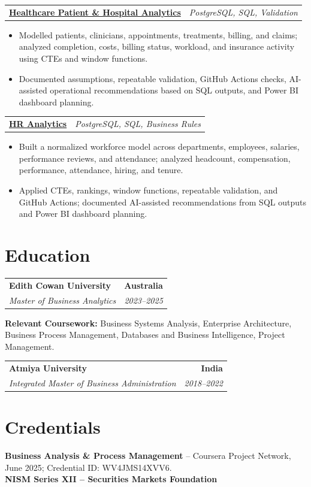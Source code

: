 \documentclass[letterpaper,10pt]{article}
\makeatletter
\newcommand{\role}[4]{%
  \begin{tabularx}{\textwidth}{@{}Xr@{}}
    \textbf{#1} & \textbf{#2} \\
    \textit{#3} & \textit{#4}
  \end{tabularx}\vspace{-1pt}
}
\newcommand{\project}[2]{%
  \begin{tabularx}{\textwidth}{@{}Xr@{}}
    \textbf{#1} & \textit{#2}
  \end{tabularx}\vspace{-1pt}
}
\makeatother
\begin{document}
\project{\href{https://github.com/jainalimehta/Healthcare-Analytics}{Healthcare Patient \& Hospital Analytics}}{PostgreSQL, SQL, Validation}
\begin{itemize}
  \item Modelled patients, clinicians, appointments, treatments, billing, and claims; analyzed completion, costs, billing status, workload, and insurance activity using CTEs and window functions.
  \item Documented assumptions, repeatable validation, GitHub Actions checks, AI-assisted operational recommendations based on SQL outputs, and Power BI dashboard planning.
\end{itemize}
\vspace{1pt}

\project{\href{https://github.com/jainalimehta/HR-Analytics}{HR Analytics}}{PostgreSQL, SQL, Business Rules}
\begin{itemize}
  \item Built a normalized workforce model across departments, employees, salaries, performance reviews, and attendance; analyzed headcount, compensation, performance, attendance, hiring, and tenure.
  \item Applied CTEs, rankings, window functions, repeatable validation, and GitHub Actions; documented AI-assisted recommendations from SQL outputs and Power BI dashboard planning.
\end{itemize}

\section{Education}
\role{Edith Cowan University}{Australia}{Master of Business Analytics}{2023--2025}
\small\textbf{Relevant Coursework:} Business Systems Analysis, Enterprise Architecture, Business Process Management, Databases and Business Intelligence, Project Management.\\[2pt]
\role{Atmiya University}{India}{Integrated Master of Business Administration}{2018--2022}

\section{Credentials}
\small\textbf{Business Analysis \& Process Management} -- Coursera Project Network, June 2025; Credential ID: WV4JMS14XVV6.\\[-0.2pt]
\small\textbf{NISM Series XII -- Securities Markets Foundation}
\end{document}
